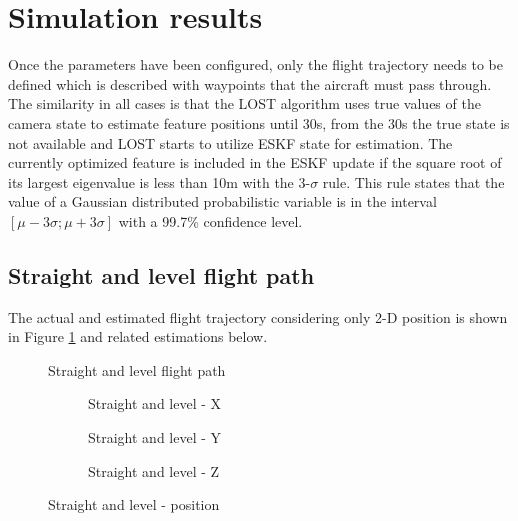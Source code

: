 \section{Simulation results}

Once the parameters have been configured, only the flight trajectory needs to be defined which is described with waypoints that the aircraft must pass through. The similarity in all cases is that the LOST algorithm uses true values of the camera state to estimate feature positions until 30\si{\second}, from the 30\si{\second} the true state is not available and LOST starts to utilize ESKF state for estimation. The currently optimized feature is included in the ESKF update if the square root of its largest eigenvalue is less than 10\si{\meter} with the 3-$\sigma$ rule. This rule states that the value of a Gaussian distributed probabilistic variable is in the interval $[\mu-3\sigma;\mu+3\sigma]$ with a 99.7\% confidence level.

\subsection{Straight and level flight path}

The actual and estimated flight trajectory considering only 2-D position is shown in Figure \ref{fig:straight-level} and related estimations below.

\begin{figure}[!ht]
    \centering
    
    \caption{Straight and level flight path}
    \label{fig:straight-level}
\end{figure}

\begin{figure}[!ht]
    \centering
    \begin{subfigure}{0.3\textwidth}
        
        \caption{Straight and level - X}
    \end{subfigure}
    \hfill
    \begin{subfigure}{0.3\textwidth}
        
        \caption{Straight and level - Y}
    \end{subfigure}
    \hfill
    \begin{subfigure}{0.3\textwidth}
        
        \caption{Straight and level - Z}
    \end{subfigure}
    \caption{Straight and level - position}
    \label{fig:straight-level-pos}
\end{figure}

